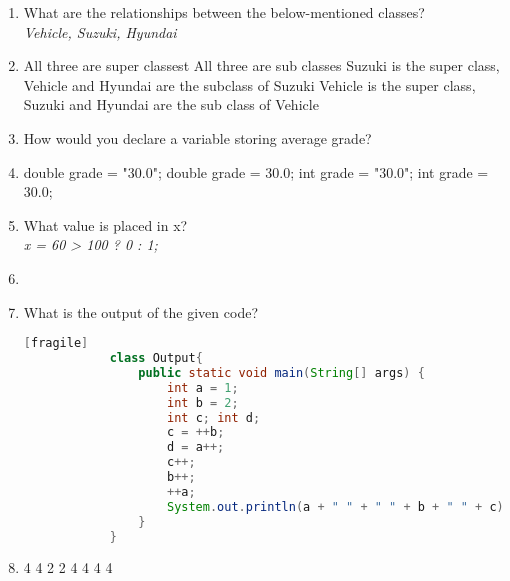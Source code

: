 \documentclass[12pt,a4paper]{exam}
\begin{document}
    \begin{enumerate}[start=1,label={\bfseries Q\arabic*)}]
    	\itemsep0.2em
    	\item What are the relationships between the below-mentioned classes?\\
    	\textit{Vehicle, Suzuki, Hyundai}
    	\item[] 
    	\begin{oneparchoices}
    		\choice All three are super classest %
    		\choice All three are sub classes 
    		\choice Suzuki is the super class, Vehicle and Hyundai are the subclass of Suzuki
    		\choice Vehicle is the super class, Suzuki and Hyundai are the sub class of Vehicle
    	\end{oneparchoices}
    	
    	\item  How would you declare a variable storing average grade?
    	\item[] 
    	\begin{oneparchoices}
    		\choice double grade = "30.0"; %
    		\choice double grade = 30.0; 
    		\choice int grade = "30.0";
    		\choice int grade = 30.0;
    	\end{oneparchoices}
    	
    
    	\item What value is placed in x?\\
    	\textit{x = 60 > 100 ? 0 : 1;}
    	\item[]   
    	\begin{oneparchoices}
    		\choice  100
    		\choice 1
    		\choice 60
    	\end{oneparchoices}
    	
    	\item  What is the output of the given code? 
    	\begin{lstlisting}[language=Java][fragile]
    		class Output{
    			public static void main(String[] args) {
    				int a = 1;
    				int b = 2;
    				int c; int d;
    				c = ++b;
    				d = a++;
    				c++;
    				b++;
    				++a;
    				System.out.println(a + " " + " " + b + " " + c);
    			}
    		}
    	\end{lstlisting}
    	\item[]   
    	\begin{oneparchoices}
    		 4 4%
    		 2 2 
    		\choice 2 4 4
    		\choice 4 4 4
    	\end{oneparchoices}
    	

\end{enumerate}
\end{document}
